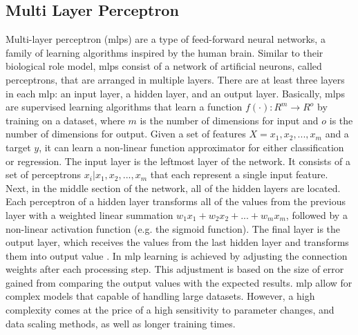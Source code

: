 \subsection{Multi Layer Perceptron}
Multi-layer perceptron (\gls{mlp}s) are a type of feed-forward neural networks, a family of learning algorithms inspired by the human brain. Similar to their biological role model, \gls{mlp}s consist of a network of artificial neurons, called perceptrons, that are arranged in multiple layers. There are at least three layers in each \gls{mlp}: an input layer, a hidden layer, and an output layer.
Basically, \gls{mlp}s are supervised learning algorithms that learn a function $f(\cdot): R^m \longrightarrow R^o$ by training on a dataset, where $m$ is the number of dimensions for input and $o$ is the number of dimensions for output. Given a set of features $X = x_{1},x_{2},...,x_{m}$ and a target $y$, it can learn a non-linear function approximator for either classification or regression.
The input layer is the leftmost layer of the network. It consists of a set of perceptrons ${x_{i}|x_{1},x_{2},...,x_{m}}$ that each represent a single input feature. Next, in the middle section of the network, all of the hidden layers are located. Each perceptron of a hidden layer transforms all of the values from the previous layer with a weighted linear summation $w_{1}x_{1} + w_{2}x_{2} + ... + w_{m}x_{m}$, followed by a non-linear activation function (e.g. the sigmoid function). The final layer is the output layer, which receives the values from the last hidden layer and transforms them into output value \cite{Pedregosa2011}. In \gls{mlp} learning is achieved by adjusting the connection weights after each processing step. This adjustment is based on the size of error gained from comparing the output values with the expected results. 
\gls{mlp} allow for complex models that capable of handling large datasets. However, a high complexity comes at the price of a high sensitivity to parameter changes, and data scaling methods, as well as longer training times. 

